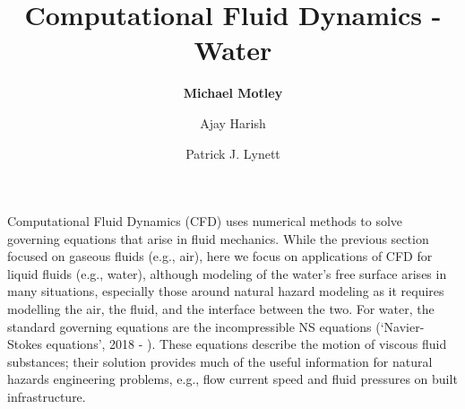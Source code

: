 %
%
%


\title{Computational Fluid Dynamics - Water}
\author{
    \textbf{Michael Motley}
    \and Ajay Harish
    \and Patrick J. Lynett}
\tocauthor{}
%
%
\maketitle

Computational Fluid Dynamics (CFD) uses numerical methods to solve governing equations that arise in fluid mechanics. While the previous section focused on gaseous fluids (e.g., air), here we focus on applications of CFD for liquid fluids (e.g., water), although modeling of the water's free surface arises in many situations, especially those around natural hazard modeling as it requires modelling the air, the fluid, and the interface between the two. For water, the standard governing equations are the incompressible NS equations (`Navier-Stokes equations', 2018 - \cite{Darrigol2005navier}). These equations describe the motion of viscous fluid substances; their solution provides much of the useful information for natural hazards engineering problems, e.g., flow current speed and fluid pressures on built infrastructure.

